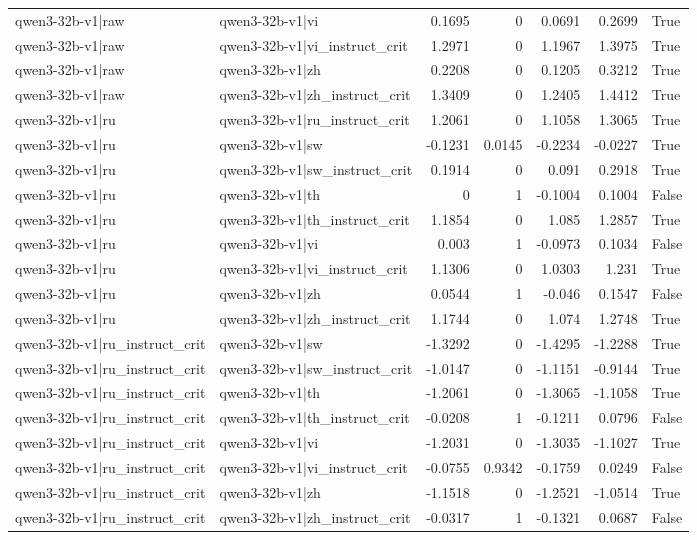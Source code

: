 \begin{table}
\begin{tabular}{l l r r r r l}
qwen3-32b-v1|raw & qwen3-32b-v1|vi & 0.1695 & 0 & 0.0691 & 0.2699 & True \\
qwen3-32b-v1|raw & qwen3-32b-v1|vi_instruct_crit & 1.2971 & 0 & 1.1967 & 1.3975 & True \\
qwen3-32b-v1|raw & qwen3-32b-v1|zh & 0.2208 & 0 & 0.1205 & 0.3212 & True \\
qwen3-32b-v1|raw & qwen3-32b-v1|zh_instruct_crit & 1.3409 & 0 & 1.2405 & 1.4412 & True \\
qwen3-32b-v1|ru & qwen3-32b-v1|ru_instruct_crit & 1.2061 & 0 & 1.1058 & 1.3065 & True \\
qwen3-32b-v1|ru & qwen3-32b-v1|sw & -0.1231 & 0.0145 & -0.2234 & -0.0227 & True \\
qwen3-32b-v1|ru & qwen3-32b-v1|sw_instruct_crit & 0.1914 & 0 & 0.091 & 0.2918 & True \\
qwen3-32b-v1|ru & qwen3-32b-v1|th & 0 & 1 & -0.1004 & 0.1004 & False \\
qwen3-32b-v1|ru & qwen3-32b-v1|th_instruct_crit & 1.1854 & 0 & 1.085 & 1.2857 & True \\
qwen3-32b-v1|ru & qwen3-32b-v1|vi & 0.003 & 1 & -0.0973 & 0.1034 & False \\
qwen3-32b-v1|ru & qwen3-32b-v1|vi_instruct_crit & 1.1306 & 0 & 1.0303 & 1.231 & True \\
qwen3-32b-v1|ru & qwen3-32b-v1|zh & 0.0544 & 1 & -0.046 & 0.1547 & False \\
qwen3-32b-v1|ru & qwen3-32b-v1|zh_instruct_crit & 1.1744 & 0 & 1.074 & 1.2748 & True \\
qwen3-32b-v1|ru_instruct_crit & qwen3-32b-v1|sw & -1.3292 & 0 & -1.4295 & -1.2288 & True \\
qwen3-32b-v1|ru_instruct_crit & qwen3-32b-v1|sw_instruct_crit & -1.0147 & 0 & -1.1151 & -0.9144 & True \\
qwen3-32b-v1|ru_instruct_crit & qwen3-32b-v1|th & -1.2061 & 0 & -1.3065 & -1.1058 & True \\
qwen3-32b-v1|ru_instruct_crit & qwen3-32b-v1|th_instruct_crit & -0.0208 & 1 & -0.1211 & 0.0796 & False \\
qwen3-32b-v1|ru_instruct_crit & qwen3-32b-v1|vi & -1.2031 & 0 & -1.3035 & -1.1027 & True \\
qwen3-32b-v1|ru_instruct_crit & qwen3-32b-v1|vi_instruct_crit & -0.0755 & 0.9342 & -0.1759 & 0.0249 & False \\
qwen3-32b-v1|ru_instruct_crit & qwen3-32b-v1|zh & -1.1518 & 0 & -1.2521 & -1.0514 & True \\
qwen3-32b-v1|ru_instruct_crit & qwen3-32b-v1|zh_instruct_crit & -0.0317 & 1 & -0.1321 & 0.0687 & False \\

\end{tabular}
\end{table}
